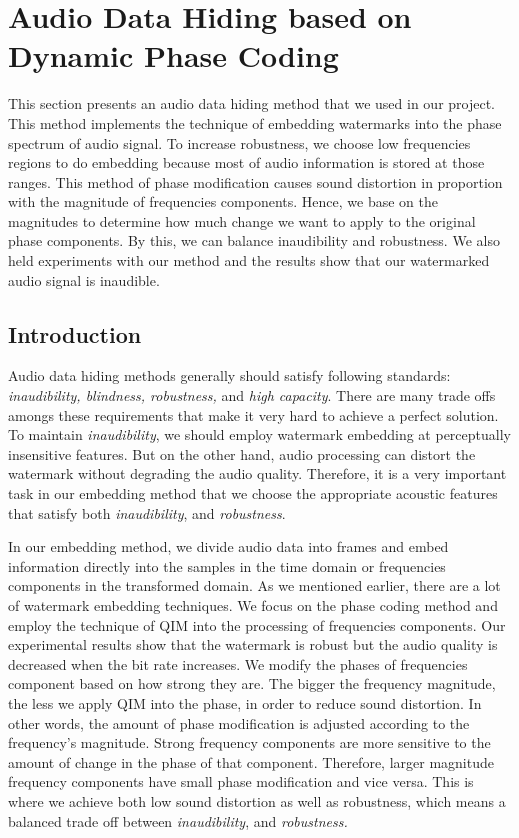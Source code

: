 \chapter{Audio Data Hiding based on Dynamic Phase Coding}
This section presents an audio data hiding method that we used in our project. This method implements the technique of embedding watermarks into the phase spectrum of audio signal. To increase robustness, we choose low frequencies regions to do embedding because most of audio information is stored at those ranges. This method of phase modification causes sound distortion in proportion with the magnitude of frequencies components. Hence, we base on the magnitudes to determine how much change we want to apply to the original phase components. By this, we can balance inaudibility and robustness. We also held experiments with our method and the results show that our watermarked audio signal is inaudible.
\section{Introduction}
Audio data hiding methods generally should satisfy following standards: \textit{inaudibility, blindness, robustness,} and \textit{high capacity}. There are many trade offs amongs these requirements that make it very hard to achieve a perfect solution. To maintain \textit{inaudibility}, we should employ watermark embedding at perceptually insensitive features. But on the other hand, audio processing can distort the watermark without degrading the audio quality. Therefore, it is a very important task in our embedding method that we choose the appropriate acoustic features that satisfy both \textit{inaudibility}, and \textit{robustness}.

In our embedding method, we divide audio data into frames and embed information directly into the samples in the time domain or frequencies components in the transformed domain. As we mentioned earlier, there are a lot of watermark embedding techniques. We focus on the phase coding method and employ the technique of QIM into the processing of frequencies components. Our experimental results show that the watermark is robust but the audio quality is decreased when the bit rate increases. We modify the phases of frequencies component based on how strong they are. The bigger the frequency magnitude, the less we apply QIM into the phase, in order to reduce sound distortion. In other words, the amount of phase modification is adjusted according to the frequency's magnitude. Strong frequency components are more sensitive to the amount of change in the phase of that component. Therefore, larger magnitude frequency components have small phase modification and vice versa. This is where we achieve both low sound distortion as well as robustness, which means a balanced trade off between \textit{inaudibility}, and \textit{robustness.} 

